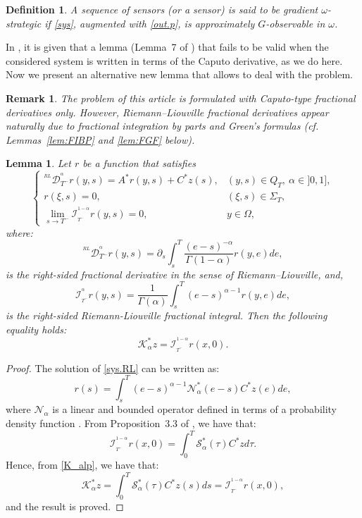 \documentclass{article}
\newtheorem{definition}[theorem]{Definition}
\newtheorem{lemma}[theorem]{Lemma}
\newtheorem{remark}[theorem]{Remark}
\begin{document}
\begin{definition}
A sequence of sensors (or a sensor) is said to be gradient $\omega$-strategic 
if \eqref{sys}, augmented with \eqref{out.p}, is approximately 
$G$-observable in $\omega$.
\end{definition}

In \cite{grad.frac}, it is given that a lemma (Lemma~7 of \cite{grad.frac})
that fails to be valid when the considered system is written in terms 
of the Caputo derivative, as we do here. Now we present an alternative 
new lemma that allows to deal with the problem.

\begin{remark}
The problem of this article is formulated with Caputo-type 
fractional derivatives only. However, Riemann--Liouville fractional derivatives 
appear naturally due to fractional integration by parts and Green's formulas 
(cf. Lemmas~\ref{lem:FIBP} and \ref{lem:FGF} below).
\end{remark}

\begin{lemma}
\label{lemma.new}
Let $r$ be a function that satisfies
\begin{equation}
\label{sys.RL}
\left\{\begin{array}{llll}
^{^{RL}}\mathcal{D}_{T^-}^{^\alpha}r(y,s) 
=  A^*r(y,s) + C^*z(s), & (y,s)\in Q_T, \ \alpha\in]0,1], \\ 
r(\xi,s) = 0,  & (\xi,s)\in \Sigma_T, \\
\lim\limits_{s\rightarrow T^-}
\mathcal{I}_{_{T^-}}^{^{1-\alpha}}r(y,s) = 0, 
& y\in\Omega,
\end{array}\right.
\end{equation}
where:
$$
^{^{RL}}\mathcal{D}_{T^-}^{^\alpha}r(y,s) 
= \partial_s\displaystyle\int_{s}^{T}
\dfrac{(e-s)^{-\alpha}}{\Gamma(1-\alpha)}r(y,e)de,
$$ 
is the right-sided fractional derivative in the sense of Riemann--Liouville, and,
$$
\mathcal{I}_{_{T^-}}^{^{\alpha}}r(y,s) 
= \dfrac{1}{\Gamma(\alpha)}\displaystyle\int_{s}^{T}(e-s)^{\alpha-1}r(y,e)de,
$$ 
is the right-sided Riemann-Liouville fractional integral. 
Then the following equality holds:
$$
\mathcal{K}_\alpha^*z = \mathcal{I}_{_{T^-}}^{^{1-\alpha}}r(x,0).
$$
\end{lemma}

\begin{proof}
The solution of \eqref{sys.RL} can be written as:
$$
r(s) = \displaystyle\int_{s}^{T}(e-s)^{\alpha-1}\mathcal{N}^*_\alpha(e-s)C^*z(e)de,
$$
where $\mathcal{N}_\alpha$ is a linear and bounded operator defined in terms 
of a probability density function \cite{zguaid.2021}.
From Proposition~3.3 of \cite{zguaid.2021}, we have that:
$$
\mathcal{I}_{_{T^-}}^{^{1-\alpha}}r(x,0) 
= \displaystyle\int_{0}^{T}\mathcal{S}_\alpha^*(\tau)C^*zd\tau.
$$
Hence, from \eqref{K_alp}, we have that:
$$
\mathcal{K}_\alpha^*z 
= \displaystyle\int_{0}^{T}\mathcal{S}_\alpha^*(\tau)C^*z(s)ds 
= \mathcal{I}_{_{T^-}}^{^{1-\alpha}}r(x,0),
$$
and the result is proved.
\end{proof}
\end{document}
